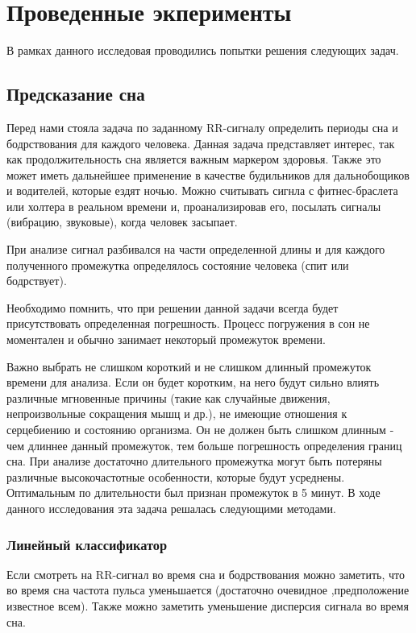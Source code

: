 \section{Проведенные экперименты}

В рамках данного исследовая проводились попытки решения следующих задач.

\subsection{Предсказание сна}
Перед нами стояла задача по заданному RR-сигналу определить периоды сна и бодрствования для каждого человека. Данная задача представляет интерес, так как продолжительность сна является важным маркером здоровья. Также это может иметь дальнейшее применение в качестве будильников для дальнобощиков и водителей, которые ездят ночью. Можно считывать сигнла с фитнес-браслета или холтера в реальном времени и, проанализировав его, посылать сигналы (вибрацию, звуковые), когда человек засыпает.

При анализе сигнал разбивался на части определенной длины и для каждого полученного промежутка определялось состояние человека (спит или бодрствует). 

Необходимо помнить, что при решении данной задачи всегда будет присутствовать определенная погрешность. Процесс погружения в сон не моментален и обычно занимает некоторый промежуток времени.

Важно выбрать не слишком короткий и не слишком длинный промежуток времени для анализа. Если он будет коротким, на него будут сильно влиять различные мгновенные причины (такие как случайные движения, непроизвольные сокращения мышц и др.), не имеющие отношения к серцебиению и состоянию организма. Он не должен быть слишком длинным - чем длиннее данный промежуток, тем больше погрешность определения границ сна. При анализе достаточно длительного промежутка могут быть потеряны различные высокочастотные особенности, которые будут усреднены. Оптимальным по длительности был признан промежуток в 5 минут.
В ходе данного исследования эта задача решалась следующими методами.
\subsubsection{Линейный классификатор}
Если смотреть на RR-сигнал во время сна и бодрствования можно заметить, что во время сна частота пульса уменьшается (достаточно очевидное ,предположение известное всем). Также можно заметить уменьшение дисперсия сигнала во время сна.

